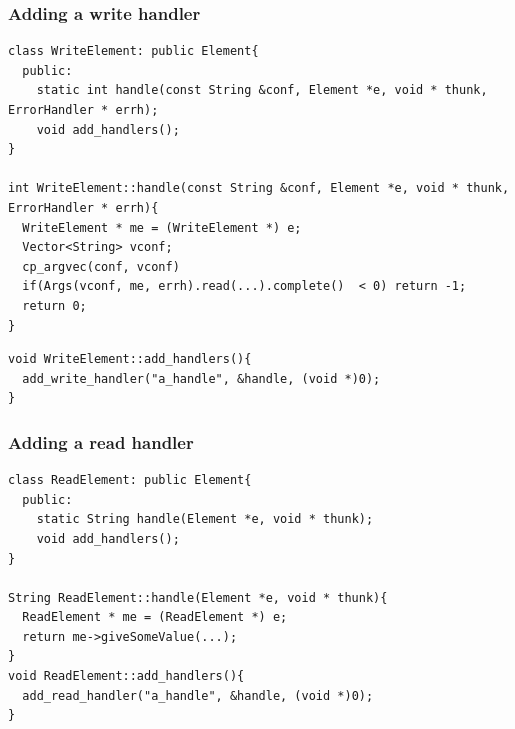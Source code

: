 \documentclass{beamer}
\begin{document}
\begin{frame}
\frametitle{Adding a write handler}
\begin{lstlisting}
class WriteElement: public Element{
  public:
    static int handle(const String &conf, Element *e, void * thunk, ErrorHandler * errh);
    void add_handlers();
}

int WriteElement::handle(const String &conf, Element *e, void * thunk, ErrorHandler * errh){
  WriteElement * me = (WriteElement *) e;
  Vector<String> vconf;
  cp_argvec(conf, vconf)
  if(Args(vconf, me, errh).read(...).complete()  < 0) return -1;
  return 0;
}
\end{lstlisting}
\begin{lstlisting}
void WriteElement::add_handlers(){
  add_write_handler("a_handle", &handle, (void *)0);
}
\end{lstlisting}
\end{frame}

\begin{frame}[fragile]
\frametitle{Adding a read handler}
\begin{lstlisting}
class ReadElement: public Element{
  public:
    static String handle(Element *e, void * thunk);
    void add_handlers();
}

String ReadElement::handle(Element *e, void * thunk){
  ReadElement * me = (ReadElement *) e;
  return me->giveSomeValue(...);
}
void ReadElement::add_handlers(){
  add_read_handler("a_handle", &handle, (void *)0);
}
\end{lstlisting}
\end{frame}
\end{document}

